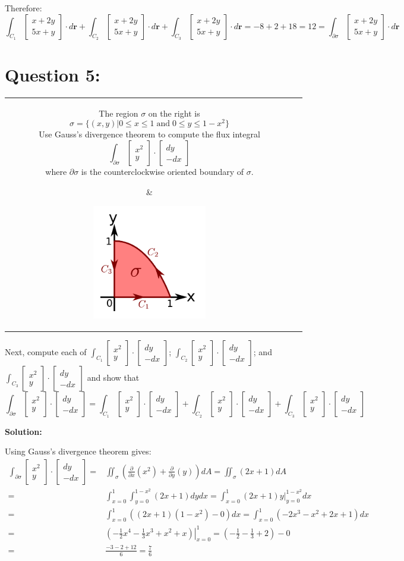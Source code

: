 \documentclass{article}
\newcommand{\colxyvec}[2]{\begin{bmatrix} #1 \\ #2 \end{bmatrix}}
\newcommand{\at}[1]{\left. #1 \right|}
\newcommand{\dr}[1]{\textcolor{dark_red}{#1}}
\begin{document}
\dr{Therefore: \[\int_{C_1} \colxyvec{x+2y}{5x+y} \cdot d\mathbf{r} + \int_{C_2} \colxyvec{x+2y}{5x+y} \cdot d\mathbf{r} + \int_{C_3} \colxyvec{x+2y}{5x+y} \cdot d\mathbf{r} = -8 + 2 + 18 = 12 = \int_{\partial\sigma} \colxyvec{x+2y}{5x+y} \cdot d\mathbf{r}\]}




\section*{Question 5:}

\begin{tabular}{cc}
\parbox{0.6\textwidth}{ 
The region \(\sigma\) on the right is 
\[\sigma = \{(x,y) | 0 \leq x \leq 1 \;\text{and}\; 0 \leq y \leq 1 - x^2\}\]
Use Gauss's divergence theorem to compute the flux integral
\[\int_{\partial\sigma} \colxyvec{x^2}{y} \cdot \colxyvec{dy}{-dx}\]
where \(\partial\sigma\) is the counterclockwise oriented boundary of \(\sigma\).
} & \parbox{0.4\textwidth}{
\includegraphics[width = 0.4\textwidth]{Test_bench_part_4x_images/Test_bench_part_4x_image_4}
}
\end{tabular}
Next, compute each of \(\int_{C_1} \colxyvec{x^2}{y} \cdot \colxyvec{dy}{-dx}\); \(\int_{C_2} \colxyvec{x^2}{y} \cdot \colxyvec{dy}{-dx}\); and \(\int_{C_3} \colxyvec{x^2}{y} \cdot \colxyvec{dy}{-dx}\) and show that 
\[\int_{\partial\sigma} \colxyvec{x^2}{y} \cdot \colxyvec{dy}{-dx} = \int_{C_1} \colxyvec{x^2}{y} \cdot \colxyvec{dy}{-dx} + \int_{C_2} \colxyvec{x^2}{y} \cdot \colxyvec{dy}{-dx}+ \int_{C_3} \colxyvec{x^2}{y} \cdot \colxyvec{dy}{-dx}\]  

\vspace{5mm}
\dr{\textbf{Solution:}}

\dr{Using Gauss's divergence theorem gives:
\begin{align*}
\int_{\partial\sigma} \colxyvec{x^2}{y} \cdot \colxyvec{dy}{-dx} = & \iint_{\sigma} (\frac{\partial}{\partial x}(x^2) + \frac{\partial}{\partial y}(y))dA 
= \iint_{\sigma} (2x + 1)dA \\
= & \int_{x=0}^1 \int_{y=0}^{1-x^2} (2x+1)dydx 
= \int_{x=0}^1 \at{(2x+1)y}_{y=0}^{1-x^2}dx \\
= & \int_{x=0}^1 ((2x+1)(1-x^2) - 0)dx 
= \int_{x=0}^1 (-2x^3 - x^2 + 2x + 1)dx \\
= & \at{(-\frac{1}{2}x^4 - \frac{1}{3}x^3 + x^2 + x)}_{x=0}^1 
= (-\frac{1}{2} - \frac{1}{3} + 2) - 0 \\
= & \frac{-3 - 2 + 12}{6} 
= \frac{7}{6} 
\end{align*}}
\end{document}
